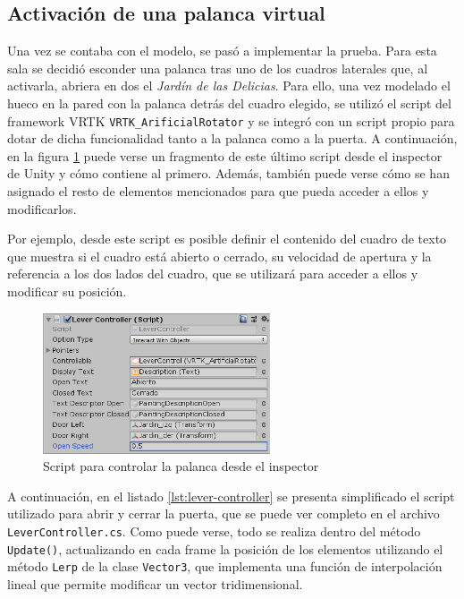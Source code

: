 \subsection{Activación de una palanca virtual}

Una vez se contaba con el modelo, se pasó a implementar la prueba. Para esta sala se decidió esconder una palanca tras uno de los cuadros laterales que, al activarla, abriera en dos el \textit{Jardín de las Delicias}. Para ello, una vez modelado el hueco en la pared con la palanca detrás del cuadro elegido, se utilizó el script del framework \acs{VRTK} \texttt{VRTK\_ArificialRotator} y se integró con un script propio para dotar de dicha funcionalidad tanto a la palanca como a la puerta. A continuación, en la figura \ref{fig:lever-controller-inspector} puede verse un fragmento de este último script desde el inspector de Unity y cómo contiene al primero. Además, también puede verse cómo se han asignado el resto de elementos mencionados para que pueda acceder a ellos y modificarlos.

Por ejemplo, desde este script es posible definir el contenido del cuadro de texto que muestra si el cuadro está abierto o cerrado, su velocidad de apertura y la referencia a los dos lados del cuadro, que se utilizará para acceder a ellos y modificar su posición.

\begin{figure}[!h]
\begin{center}
\includegraphics[width=0.6\textwidth]{imagenes/7/lever-controller.png}
\caption{Script para controlar la palanca desde el inspector}
\label{fig:lever-controller-inspector}
\end{center}
\end{figure}

A continuación, en el listado \ref{lst:lever-controller} se presenta simplificado el script utilizado para abrir y cerrar la puerta, que se puede ver completo en el archivo \texttt{LeverController.cs}. Como puede verse, todo se realiza dentro del método \texttt{Update()}, actualizando en cada frame la posición de los elementos utilizando el método \texttt{Lerp} de la clase \texttt{Vector3}, que implementa una función de interpolación lineal que permite modificar un vector tridimensional.


